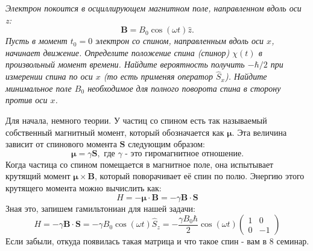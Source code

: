 \begin{center}
    \textit{Электрон покоится в осциллирующем магнитном поле, направленном вдоль оси z:}
    \[
    \mathbf{B} = B_0\cos(\omega t)\hat{z}.
    \]
    \textit{Пусть в момент $t_0 = 0$ электрон со спином, направленным вдоль оси $x$, начинает движение. Определите положение спина (спинор) $\chi(t)$ в произвольный момент времени. Найдите вероятность получить $-\hbar/2$ при измерении спина по оси $x$ (то есть применяя оператор $\hat{S}_x$). Найдите минимальное поле $B_0$ необходимое для полного поворота спина в сторону против оси $x$.}
\end{center}

Для начала, немного теории. У частиц со спином есть так называемый собственный магнитный момент, который обозначается как $\boldsymbol{\mu}$. Эта величина зависит от спинового момента $\mathbf{S}$ следующим образом:
\[
\boldsymbol{\mu} = \gamma \mathbf{S}, \text{ где $\gamma$ - это гиромагнитное отношение.}
\]
Когда частица со спином помещается в магнитное поле, она испытывает крутящий момент $\boldsymbol{\mu} \times \mathbf{B}$, который поворачивает её спин по полю. Энергию этого крутящего момента можно вычислить как:
\[
H = -\boldsymbol{\mu}\cdot\mathbf{B} = -\gamma\mathbf{B}\cdot\mathbf{S}
\]
Зная это, запишем гамильтониан для нашей задачи:
\[
H = -\gamma\mathbf{B}\cdot\mathbf{S} = -\gamma B_0\cos(\omega t) \hat{S}_z = -\frac{\gamma B_0\hbar}{2}\cos(\omega t)\begin{pmatrix} 1 & 0 \\ 0 & -1 \end{pmatrix}
\]
Если забыли, откуда появилась такая матрица и что такое спин - вам в 8 семинар. 

